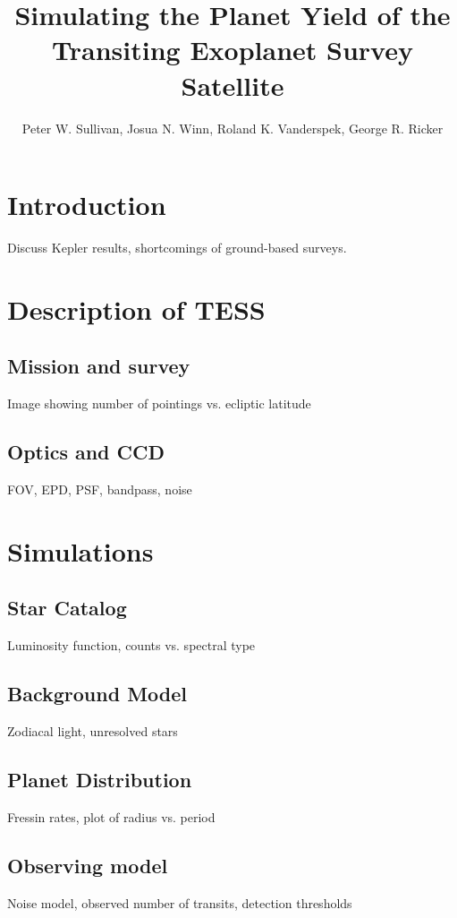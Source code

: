 \documentclass[preprint]{aastex}
\begin{document}
\title{Simulating the Planet Yield of the Transiting Exoplanet Survey Satellite}

\author{Peter W. Sullivan, Josua N. Winn, Roland K. Vanderspek, George R. Ricker}



\section{Introduction}
Discuss Kepler results, shortcomings of ground-based surveys.

\section{Description of TESS}
\subsection{Mission and survey}
Image showing number of pointings vs. ecliptic latitude
\subsection{Optics and CCD}
FOV, EPD, PSF, bandpass, noise

\section{Simulations}
\subsection{Star Catalog}
Luminosity function, counts vs. spectral type
\subsection{Background Model}
Zodiacal light, unresolved stars
\subsection{Planet Distribution}
Fressin rates, plot of radius vs. period
\subsection{Observing model}
Noise model, observed number of transits, detection thresholds
\end{document}
